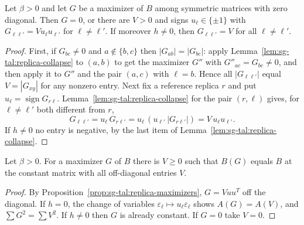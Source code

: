 \begin{proposition}\label{prop:sg-tal:replica-maximizers}
\leanok
{}
Let $\beta>0$ and let $G$ be a maximizer of $B$ among symmetric matrices with zero diagonal. Then $G=0$, or there are $V>0$ and signs $u_\ell\in\{\pm1\}$ with $G_{\ell\ell'}=Vu_\ell u_{\ell'}$ for $\ell\ne\ell'$.
If moreover $h\ne0$, then $G_{\ell\ell'}=V$ for all $\ell\ne\ell'$.
\end{proposition}
\begin{proof}
\leanok
First, if $G_{bc}\ne0$ and $a\notin\{b,c\}$ then $|G_{ab}|=|G_{bc}|$: apply Lemma~\ref{lem:sg-tal:replica-collapse} to $(a,b)$ to get the maximizer $G''$ with $G''_{ac}=G_{bc}\ne0$, and then apply it to $G''$ and the pair $(a,c)$ with $\ell=b$.
Hence all $|G_{\ell\ell'}|$ equal $V=|G_{xy}|$ for any nonzero entry. Next fix a reference replica $r$ and put $u_\ell=\operatorname{sign}G_{r\ell}$. Lemma~\ref{lem:sg-tal:replica-collapse} for the pair $(r,\ell)$ gives, for $\ell\ne\ell'$ both different from $r$,
\[
G_{\ell\ell'}=u_\ell\,G_{r\ell'}=u_\ell\,(u_{\ell'}\,|G_{r\ell'}|)=V\,u_\ell u_{\ell'} .
\]
If $h\ne0$ no entry is negative, by the last item of Lemma~\ref{lem:sg-tal:replica-collapse}.
\end{proof}

\begin{corollary}[Corollary~1.13.3]\label{cor:sg-tal:replica-constant}
\leanok
{}
Let $\beta>0$. For a maximizer $G$ of $B$ there is $V\ge0$ such that $B(G)$ equals $B$ at the constant matrix with all off-diagonal entries $V$.
\end{corollary}
\begin{proof}
\leanok
By Proposition~\ref{prop:sg-tal:replica-maximizers}, $G=Vuu^{T}$ off the diagonal. If $h=0$, the change of variables $\varepsilon_\ell\mapsto u_\ell\varepsilon_\ell$ shows $A(G)=A(V)$, and $\sum G^2=\sum V^2$.
If $h\ne0$ then $G$ is already constant. If $G=0$ take $V=0$.
\end{proof}

